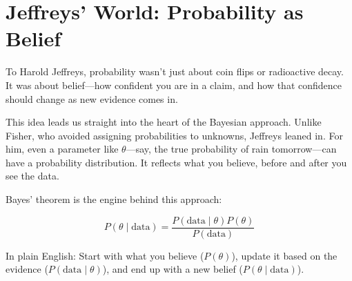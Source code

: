 \section{Jeffreys’ World: Probability as Belief}

To Harold Jeffreys, probability wasn’t just about coin flips or radioactive decay. It was about belief—how confident you are in a claim, and how that confidence should change as new evidence comes in.

This idea leads us straight into the heart of the Bayesian approach. Unlike Fisher, who avoided assigning probabilities to unknowns, Jeffreys leaned in. For him, even a parameter like \( \theta \)—say, the true probability of rain tomorrow—can have a probability distribution. It reflects what you believe, before and after you see the data.

Bayes’ theorem is the engine behind this approach:

\[
P(\theta \mid \text{data}) = \frac{P(\text{data} \mid \theta) P(\theta)}{P(\text{data})}
\]

In plain English:  
Start with what you believe (\( P(\theta) \)), update it based on the evidence (\( P(\text{data} \mid \theta) \)), and end up with a new belief (\( P(\theta \mid \text{data}) \)).



